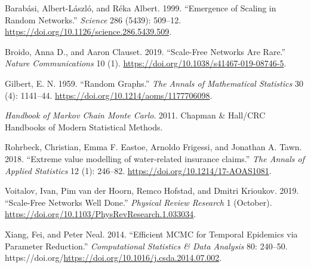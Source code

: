 \documentclass[
]{article}
\newlength{\cslhangindent}
\newlength{\cslentryspacingunit} %
\newenvironment{CSLReferences}[2] %
 {%
  \setlength{\parindent}{0pt}
  \ifodd #1
  \let\oldpar\par
  \def\par{\hangindent=\cslhangindent\oldpar}
  \fi
  \setlength{\parskip}{#2\cslentryspacingunit}
 }%
 {}
\begin{document}
\hypertarget{refs}{}
\begin{CSLReferences}{1}{0}
\leavevmode{}%
Barabási, Albert-László, and Réka Albert. 1999. {``Emergence of Scaling
in Random Networks.''} \emph{Science} 286 (5439): 509--12.
\url{https://doi.org/10.1126/science.286.5439.509}.

\leavevmode{}%
Broido, Anna D., and Aaron Clauset. 2019. {``Scale-Free Networks Are
Rare.''} \emph{Nature Communications} 10 (1).
\url{https://doi.org/10.1038/s41467-019-08746-5}.

\leavevmode{}%
Gilbert, E. N. 1959. {``{Random Graphs}.''} \emph{The Annals of
Mathematical Statistics} 30 (4): 1141--44.
\url{https://doi.org/10.1214/aoms/1177706098}.

\leavevmode{}%
\emph{Handbook of Markov Chain Monte Carlo}. 2011. Chapman \& Hall/CRC
Handbooks of Modern Statistical Methods.

\leavevmode{}%
Rohrbeck, Christian, Emma F. Eastoe, Arnoldo Frigessi, and Jonathan A.
Tawn. 2018. {``{Extreme value modelling of water-related insurance
claims}.''} \emph{The Annals of Applied Statistics} 12 (1): 246--82.
\url{https://doi.org/10.1214/17-AOAS1081}.

\leavevmode{}%
Voitalov, Ivan, Pim van der Hoorn, Remco Hofstad, and Dmitri Krioukov.
2019. {``Scale-Free Networks Well Done.''} \emph{Physical Review
Research} 1 (October).
\url{https://doi.org/10.1103/PhysRevResearch.1.033034}.

\leavevmode{}%
Xiang, Fei, and Peter Neal. 2014. {``Efficient MCMC for Temporal
Epidemics via Parameter Reduction.''} \emph{Computational Statistics \&
Data Analysis} 80: 240--50.
https://doi.org/\url{https://doi.org/10.1016/j.csda.2014.07.002}.

\end{CSLReferences}
\end{document}
